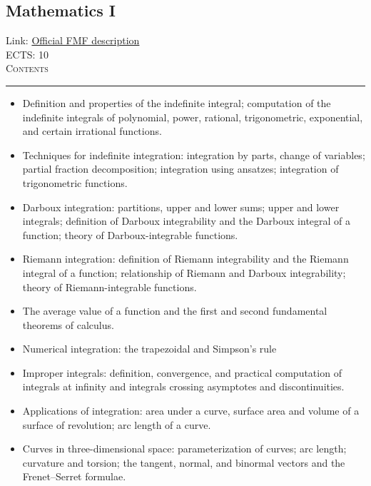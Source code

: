 \documentclass[11pt, a4paper]{article}
\newenvironment{course}[3]{
\subsection{#1}%
Link: \href{#2}{Official FMF description}\\%
ECTS: #3%
\vspace{1ex}
\\
{\large \textsc{Contents}}\\[-0.9ex]%
\rule{\textwidth}{0.5pt}
\vspace{-3ex}
}
{}
\newenvironment{chapter}[1]{
\begin{tcolorbox}[title=#1, breakable]
}
{\end{tcolorbox}}
\begin{document}
\begin{course}{Mathematics I}{https://www.fmf.uni-lj.si/en/study-physics/programmes/1fiz/2020/7000777/courses/520/}{10}
    \begin{chapter}{Integral calculus}
        \begin{itemize}
            \item Definition and properties of the indefinite integral; computation of the indefinite integrals of polynomial, power, rational, trigonometric, exponential, and certain irrational functions.

            \item Techniques for indefinite integration: integration by parts, change of variables; partial fraction decomposition; integration using ansatzes; integration of trigonometric functions.

            \item Darboux integration: partitions, upper and lower sums; upper and lower integrals; definition of Darboux integrability and the Darboux integral of a function; theory of Darboux-integrable functions.

            \item Riemann integration: definition of Riemann integrability and the Riemann integral of a function; relationship of Riemann and Darboux integrability; theory of Riemann-integrable functions.

            \item The average value of a function and the first and second fundamental theorems of calculus.

            \item Numerical integration: the trapezoidal and Simpson's rule

            \item Improper integrals: definition, convergence, and practical computation of integrals at infinity and integrals crossing asymptotes and discontinuities.

            \item Applications of integration: area under a curve, surface area and volume of a surface of revolution; arc length of a curve.

            \item Curves in three-dimensional space: parameterization of curves; arc length; curvature and torsion; the tangent, normal, and binormal vectors and the Frenet–Serret formulae.

        \end{itemize}
    \end{chapter}

    \begin{chapter}{Taylor and power series}
        \begin{itemize}
        

\end{itemize}
\end{chapter}
\end{course}
\end{document}
